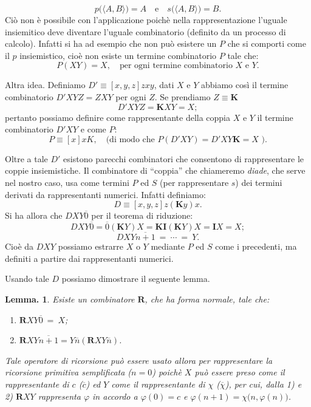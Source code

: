 \documentclass{book}
\newtheorem{lemma}{Lemma.}[chapter]
\newcommand*{\ii}{\mathbf{I}}    %
\newcommand*{\kk}{\mathbf{K}}    %
\begin{document}
\[
p\bigl(\langle A, B\rangle\bigr) =  A\quad \text{e}\quad s\bigl(\langle A, 
B\rangle\bigr) = B. 
\]
Ci\`o non \`e possibile con l'applicazione poich\`e nella rappresentazione 
l'uguale insiemitico deve diventare l'uguale combinatorio (definito da un 
processo di calcolo). Infatti si ha ad esempio che non pu\`o esistere un $P$
che si comporti come il $p$ insiemistico, cio\`e non esiste un termine 
combinatorio $P$ tale che:
\[
P(XY) = X, \quad \text{per ogni termine combinatorio } X \text{ e }Y.
\]

Altra idea. Definiamo $D' \equiv [x,y,z]zxy$, dati $X$ e $Y$ abbiamo cos\`i il
termine combinatorio $D'XYZ = ZXY$ per ogni $Z$. Se prendiamo $Z \equiv \kk$
\[
D'XYZ = \kk XY = X;
\]
pertanto possiamo definire come rappresentante della coppia $X$ e $Y$ il 
termine combinatorio $D'XY$ e come $P$:
\[
P \equiv [x]xK, \quad \text{(di modo che } P(D'XY) = D'XY\kk = X \text{ ).}
\]

Oltre a tale $D'$ esistono parecchi combinatori che consentono di rappresentare
 le coppie insiemistiche. Il combinatore di ``coppia'' che chiameremo 
\emph{diade}, che serve nel nostro caso, usa come termini $P$ ed $S$ (per 
rappresentare $s$) dei termini
derivati da rappresentanti numerici. Infatti definiamo:
\[
D \equiv [x, y, z]z(\kk y)x.
\]
Si ha allora che $DXY\overline{0}$ per il teorema di riduzione:
\[
DXY\overline{0} = \overline{0}(\kk Y)X = \kk \ii(\kk Y)X = \ii X = X;
\]
\[
DXY\overline{n+1}\ = \ \cdots \ = \ Y.
\]
Cio\`e da $DXY$ possiamo estrarre $X$ o $Y$ mediante $P$ ed $S$ come i 
precedenti, ma definiti a partire dai rappresentanti numerici.

Usando tale $D$ possiamo dimostrare il seguente lemma.

\begin{lemma}
Esiste un combinatore $\mathbf{R}$, che ha forma normale, tale che:
\begin{enumerate}
  \item[1)] $\mathbf{R}XY\overline{0} \ = \ X$;
  \item[2)] $\mathbf{R}XY\overline{n+1} = Y\overline{n}(\mathbf{R}XY
    \overline{n})$.
\end{enumerate}
Tale operatore di ricorsione pu\`o essere usato allora per rappresentare la 
ricorsione primitiva semplificata ($n = 0$) poich\`e $X$ pu\`o essere preso 
come il rappresentante di $c$ ($\overline{c}$) ed $Y$ come il rappresentante di
$\chi$ ($\overline{\chi}$), per cui, dalla 1) e 2) $\mathbf{R}XY$ 
rappresenta $\varphi$ in accordo a $\varphi(0) = c$ e $\varphi(n+1) = \chi\bigl
(n,\varphi(n)\bigr)$.
\end{lemma}
\end{document}
